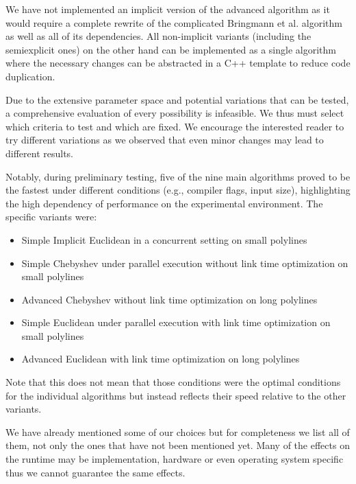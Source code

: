 We have not implemented an implicit version of the advanced algorithm as it would require a complete rewrite of the complicated Bringmann et al. algorithm as well as all of its dependencies. All non-implicit variants (including the semiexplicit ones) on the other hand can be implemented as a single algorithm where the necessary changes can be abstracted in a C++ template to reduce code duplication. 

Due to the extensive parameter space and potential variations that can be tested, a comprehensive evaluation of every possibility is infeasible. We thus must select which criteria to test and which are fixed. We encourage the interested reader to try different variations as we observed that even minor changes may lead to different results. 

Notably, during preliminary testing, five of the nine main algorithms proved to be the fastest under different conditions (e.g., compiler flags, input size), highlighting the high dependency of performance on the experimental environment. The specific variants were:
\begin{itemize}
	\item Simple Implicit Euclidean in a concurrent setting on small polylines 
	\item Simple Chebyshev under parallel execution without link time optimization on small polylines 
	\item Advanced Chebyshev without link time optimization on long polylines 
	\item Simple Euclidean under parallel execution with link time optimization on small polylines 
	\item Advanced Euclidean with link time optimization on long polylines 
\end{itemize}
Note that this does not mean that those conditions were the optimal conditions for the individual algorithms but instead reflects their speed relative to the other variants.

We have already mentioned some of our choices but for completeness we list all of them, not only the ones that have not been mentioned yet. Many of the effects on the runtime may be implementation, hardware or even operating system specific thus we cannot guarantee the same effects. 

